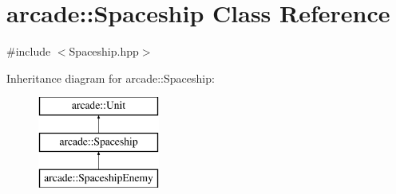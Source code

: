 \hypertarget{classarcade_1_1_spaceship}{}\section{arcade\+:\+:Spaceship Class Reference}
\label{classarcade_1_1_spaceship}


{\ttfamily \#include $<$Spaceship.\+hpp$>$}

Inheritance diagram for arcade\+:\+:Spaceship\+:\begin{figure}[H]
\begin{center}
\leavevmode
\includegraphics[height=3.000000cm]{classarcade_1_1_spaceship}
\end{center}
\end{figure}
